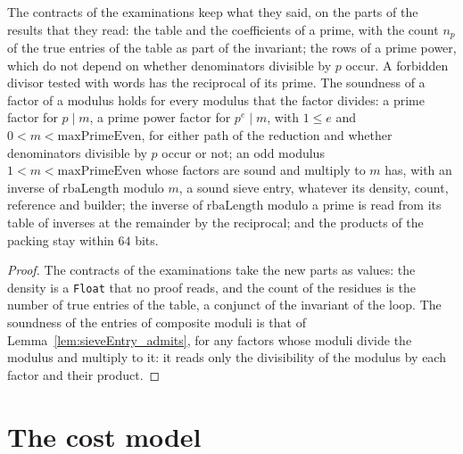 \begin{lemma}\label{lem:densities}
  \leanok
  The contracts of the examinations keep what they said, on the parts of the results that they read:
  the table and the coefficients of a prime, with the count $n_p$ of the true entries of the table
  as part of the invariant; the rows of a prime power, which do not depend on whether denominators
  divisible by $p$ occur. A forbidden divisor tested with words has the reciprocal of its prime. The
  soundness of a factor of a modulus holds for every modulus that the factor divides: a prime factor
  for $p \mid m$, a prime power factor for $p^e \mid m$, with $1 \le e$ and
  $0 < m < \mathrm{maxPrimeEven}$, for either path of the reduction and whether denominators
  divisible by $p$ occur or not; an odd modulus $1 < m < \mathrm{maxPrimeEven}$ whose factors are
  sound and multiply to $m$ has, with an inverse of $\mathrm{rbaLength}$ modulo $m$, a sound sieve
  entry, whatever its density, count, reference and builder; the inverse of $\mathrm{rbaLength}$
  modulo a prime is read from its table of inverses at the remainder by the reciprocal; and the
  products of the packing stay within $64$ bits.
\end{lemma}

\begin{proof}
  \leanok
  The contracts of the examinations take the new parts as values: the density is a \verb|Float| that
  no proof reads, and the count of the residues is the number of true entries of the table, a
  conjunct of the invariant of the loop. The soundness of the entries of composite moduli is that of
  Lemma~\ref{lem:sieveEntry_admits}, for any factors whose moduli divide the modulus and multiply to
  it: it reads only the divisibility of the modulus by each factor and their product.
\end{proof}

\section{The cost model}\label{sec:costs}

